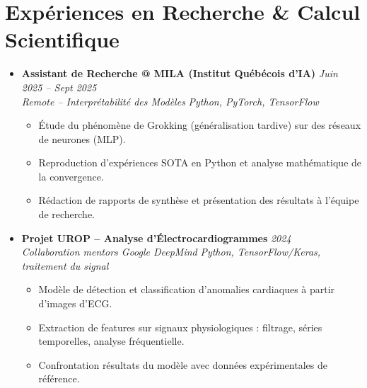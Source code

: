 \documentclass[a4paper,11pt]{article}
\begin{document}
\section{Expériences en Recherche \& Calcul Scientifique}
\begin{itemize}[leftmargin=*, label={-}]

\item \textbf{Assistant de Recherche @ MILA (Institut Québécois d'IA)} \hfill \textit{Juin 2025 -- Sept 2025} \\
\textit{Remote -- Interprétabilité des Modèles} \hfill \textit{Python, PyTorch, TensorFlow}
\vspace{-2pt}
    \begin{itemize}[leftmargin=0.4cm, nosep, label=\tiny$\bullet$]
        \item \small{Étude du phénomène de Grokking (généralisation tardive) sur des réseaux de neurones (MLP).}
        \item \small{Reproduction d'expériences SOTA en Python et analyse mathématique de la convergence.}
        \item \small{Rédaction de rapports de synthèse et présentation des résultats à l'équipe de recherche.}
    \end{itemize}
\vspace{3pt}

\item \textbf{Projet UROP -- Analyse d'Électrocardiogrammes} \hfill \textit{2024} \\
\textit{Collaboration mentors Google DeepMind} \hfill \textit{Python, TensorFlow/Keras, traitement du signal}
\vspace{-2pt}
    \begin{itemize}[leftmargin=0.4cm, nosep, label=\tiny$\bullet$]
        \item \small{Modèle de détection et classification d'anomalies cardiaques à partir d'images d'ECG.}
        \item \small{Extraction de features sur signaux physiologiques : filtrage, séries temporelles, analyse fréquentielle.}
        \item \small{Confrontation résultats du modèle avec données expérimentales de référence.}
    \end{itemize}
\vspace{3pt}


\end{itemize}
\end{document}
